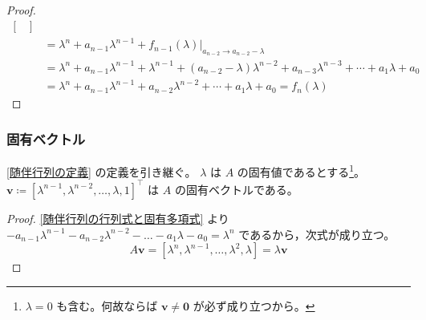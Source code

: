 \begin{proof}
\begin{align*}
\begin{bmatrix}
                        \end{bmatrix} \\
                        &= \lambda^{n} + a_{n-1}\lambda^{n-1} + \left.f_{n-1}(\lambda)\right|_{a_{n-2}\to a_{n-2}-\lambda} \\
                        &= \lambda^{n} + a_{n-1}\lambda^{n-1} + \lambda^{n-1} + (a_{n-2}-\lambda)\lambda^{n-2} + a_{n-3}\lambda^{n-3} + \dotsb + a_1\lambda + a_0 \\
                        &= \lambda^{n} + a_{n-1}\lambda^{n-1} + a_{n-2}\lambda^{n-2} + \dotsb + a_1\lambda + a_0 = f_n(\lambda)
                    \end{align*}
                \end{proof}
            \subsubsection{固有ベクトル}
                \label{随伴行列の固有ベクトル}
                \begin{shadebox}
                    \ref{随伴行列の定義} の定義を引き継ぐ。
                    $\lambda$ は $A$ の固有値であるとする\footnote{$\lambda=0$ も含む。何故ならば $\bm{v}\neq\bm{0}$ が必ず成り立つから。}。
                    $\bm{v}\coloneq[\lambda^{n-1},\lambda^{n-2},\dots,\lambda,1]^\top$ は $A$ の固有ベクトルである。
                \end{shadebox}
                \begin{proof}
                    \quad\par
                    \ref{随伴行列の行列式と固有多項式} より $-a_{n-1}\lambda^{n-1}- a_{n-2}\lambda^{n-2} - \dots - a_1\lambda - a_0 = \lambda^n$ であるから，次式が成り立つ。
                    \[ A\bm{v} = [\lambda^n,\lambda^{n-1},\dots,\lambda^2,\lambda] = \lambda\bm{v} \]
                \end{proof}
